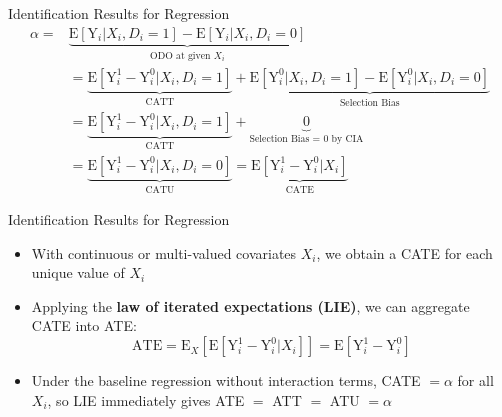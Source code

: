 \documentclass[dvipsnames,hyperref={pdfpagelabels=false}]{beamer}
\begin{document}
\begin{frame}{Identification Results for Regression}
	\begin{equation*}
	\begin{aligned}
	\alpha =& \underbrace{\mathrm{E}[\mathrm{Y}_{i}|X_{i},D_{i}=1] - \mathrm{E}[\mathrm{Y}_{i}|X_{i},D_{i}=0]}_{\text{ODO at given $X_{i}$}} \\
	&= \underbrace{\mathrm{E}[\mathrm{Y}^{1}_{i}-\mathrm{Y}^{0}_{i}|X_{i},D_i=1]}_{\text{CATT}} 
	+\underbrace{\mathrm{E}[\mathrm{Y}^{0}_{i}|X_{i},D_i=1]-\mathrm{E}[\mathrm{Y}^{0}_{i}|X_{i},D_i=0]}_{\text{Selection Bias}} \\
	&= \underbrace{\mathrm{E}[\mathrm{Y}^{1}_{i}-\mathrm{Y}^{0}_{i}|X_{i},D_i=1]}_{\text{CATT}} + \underbrace{0}_{\text{Selection Bias = 0 by CIA}}  \\
	&=\underbrace{\mathrm{E}[\mathrm{Y}^{1}_{i}-\mathrm{Y}^{0}_{i}|X_{i},D_i=0]}_{\text{CATU}} 
	=\underbrace{\mathrm{E}[\mathrm{Y}^{1}_{i}-\mathrm{Y}^{0}_{i}|X_{i}]}_{\text{CATE}}
	\end{aligned}
	\end{equation*}
	\vspace{0.2cm}
\end{frame}


\begin{frame}{Identification Results for Regression}
	\begin{itemize}	
		\item With continuous or multi-valued covariates $X_i$, we obtain a CATE for each unique value of $X_i$
		\vspace{0.2cm}
		\item Applying the \textbf{law of iterated expectations (LIE)}, we can aggregate CATE into ATE:
		\vspace{0.2cm}
		\begin{equation*}
			\mathrm{ATE} = \mathrm{E}_{X}\left[\mathrm{E}[\mathrm{Y}^{1}_{i}-\mathrm{Y}^{0}_{i}|X_{i}]\right] = \mathrm{E}[\mathrm{Y}^{1}_{i}-\mathrm{Y}^{0}_{i}]
		\end{equation*}
		\vspace{0.1cm}
		\item Under the baseline regression without interaction terms, CATE $= \alpha$ for all $X_i$, so LIE immediately gives ATE $=$ ATT $=$ ATU $= \alpha$
	\end{itemize}
\end{frame}
\end{document}
